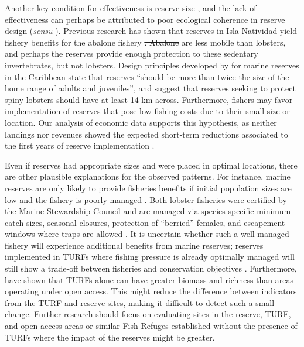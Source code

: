 \documentclass{frontiersSCNS}
\providecommand{\DIFaddtex}[1]{{\protect\color{blue}\uwave{#1}}} %
\providecommand{\DIFdeltex}[1]{{\protect\color{red}\sout{#1}}}                      %
\providecommand{\DIFaddbegin}{} %
\providecommand{\DIFaddend}{} %
\providecommand{\DIFdelbegin}{} %
\providecommand{\DIFdelend}{} %
\providecommand{\DIFadd}[1]{\texorpdfstring{\DIFaddtex{#1}}{#1}} %
\providecommand{\DIFdel}[1]{\texorpdfstring{\DIFdeltex{#1}}{}} %
\begin{document}
Another key condition for effectiveness is reserve size
\citep{edgar_2014-UO}, and the lack of effectiveness can perhaps be
attributed to poor ecological coherence in reserve design (\emph{sensu}
\citet{rees_2018}). Previous research has shown that reserves in Isla
Natividad yield fishery benefits for the abalone fishery
\citep{rossetto_2015-V0}\DIFdelbegin \DIFdel{. Abalone }\DIFdelend \DIFaddbegin \DIFadd{, however, abalone }\DIFaddend are less mobile than
lobsters, and perhaps the reserves provide enough protection to these
sedentary invertebrates, but not lobsters. Design principles developed
by \citet{green_2017} for marine reserves in the Caribbean state that
reserves ``should be more than twice the size of the home range of
adults and juveniles'', and suggest that reserves seeking to protect
spiny lobsters should have at least 14 km across. Furthermore, fishers
may favor implementation of reserves that pose low fishing costs due to
their small size or location. Our analysis of economic data supports
this hypothesis, as neither landings nor revenues showed the expected
short-term reductions associated to the first years of reserve
implementation \citep{ovando_2016-Wg}.

Even if reserves had appropriate sizes and were placed in optimal
locations, there are other plausible explanations for the observed
patterns. For instance, marine reserves are only likely to provide
fisheries benefits if initial population sizes are low and the fishery
is poorly managed \citep{hilborn_2004,hilborn_2006}. Both lobster
fisheries were certified by the Marine Stewardship Council and are
managed via species-specific minimum catch sizes, seasonal closures,
protection of ``berried'' females, and escapement windows where traps
are allowed \citep{dof_website_1993}. It is uncertain whether such a
well-managed fishery will experience additional benefits from marine
reserves; reserves implemented in TURFs where fishing pressure is
already optimally managed will still show a trade-off between fisheries
and conservation objectives \citep{lester_2017}. Furthermore,
\citet{gelcich_2008} have shown that TURFs alone can have greater
biomass and richness than areas operating under open access. This might
reduce the difference between indicators from the TURF and reserve
sites, making it difficult to detect such a small change. Further
research should focus on evaluating sites in the reserve, TURF, and open
access areas or similar Fish Refuges established without the presence of
TURFs where the impact of the reserves might be greater.
\end{document}
